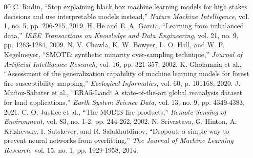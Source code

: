 \documentclass[journal, 10pt, twocolumn]{IEEEtran}
\begin{document}
\begin{thebibliography}{00}
 C. Rudin, ``Stop explaining black box machine learning models for high stakes decisions and use interpretable models instead,'' \textit{Nature Machine Intelligence}, vol. 1, no. 5, pp. 206-215, 2019.
 H. He and E. A. Garcia, ``Learning from imbalanced data,'' \textit{IEEE Transactions on Knowledge and Data Engineering}, vol. 21, no. 9, pp. 1263-1284, 2009.
 N. V. Chawla, K. W. Bowyer, L. O. Hall, and W. P. Kegelmeyer, ``SMOTE: synthetic minority over-sampling technique,'' \textit{Journal of Artificial Intelligence Research}, vol. 16, pp. 321-357, 2002.
 K. Gholamnia et al., ``Assessment of the generalization capability of machine learning models for forest fire susceptibility mapping,'' \textit{Ecological Informatics}, vol. 60, p. 101168, 2020.
 J. Muñoz-Sabater et al., ``ERA5-Land: A state-of-the-art global reanalysis dataset for land applications,'' \textit{Earth System Science Data}, vol. 13, no. 9, pp. 4349-4383, 2021.
 C. O. Justice et al., ``The MODIS fire products,'' \textit{Remote Sensing of Environment}, vol. 83, no. 1-2, pp. 244-262, 2002.
 N. Srivastava, G. Hinton, A. Krizhevsky, I. Sutskever, and R. Salakhutdinov, ``Dropout: a simple way to prevent neural networks from overfitting,'' \textit{The Journal of Machine Learning Research}, vol. 15, no. 1, pp. 1929-1958, 2014.
\end{thebibliography}
\end{document}
